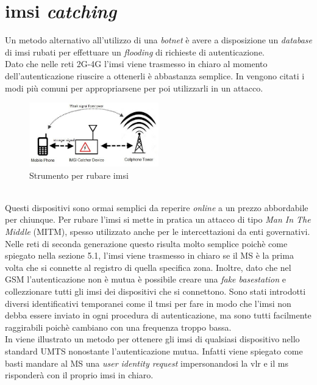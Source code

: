 \section{\gls{imsi} \textit{catching}}
Un metodo alternativo all'utilizzo di una \textit{botnet} è avere a disposizione un \textit{database} di \gls{imsi} rubati per effettuare un \textit{flooding} di richieste di autenticazione.\\
Dato che nelle reti 2G-4G l'\gls{imsi} viene trasmesso in chiaro al momento dell'autenticazione riuscire a ottenerli è abbastanza semplice.
In \cite{imsi-catcher} vengono citati i modi più comuni per appropriarsene per poi utilizzarli in un 
attacco.
\begin{figure}[h]
    \centering
    \includegraphics[width=0.5\textwidth]{images/imsi-catcher.jpg}
    \caption{Strumento per rubare \gls{imsi}}
\end{figure}\\
Questi dispositivi sono ormai semplici da reperire \textit{online} a un prezzo abbordabile per chiunque. Per rubare l'\gls{imsi} si mette in pratica un attacco di tipo \textit{Man In The Middle} (MITM), spesso utilizzato
anche per le intercettazioni da enti governativi.\\
Nelle reti di seconda generazione questo risulta molto semplice poichè come spiegato nella sezione 5.1, l'\gls{imsi} viene trasmesso in chiaro se il MS è la prima volta che si connette al registro di quella specifica
zona. Inoltre, dato che nel GSM l'autenticazione non è mutua è possibile creare una \textit{fake basestation} e collezzionare tutti gli \gls{imsi} dei dispositivi che si connettono.
Sono stati introdotti diversi identificativi temporanei come il \gls{tmsi} per fare in modo che l'\gls{imsi} non debba essere inviato in ogni procedura di autenticazione, ma sono tutti facilmente raggirabili poichè cambiano con una
frequenza troppo bassa.\\
In \cite{dos-imsi} viene illustrato un metodo per ottenere gli \gls{imsi} di qualsiasi dispositivo nello standard UMTS nonostante l'autenticazione mutua. Infatti viene spiegato come basti mandare al MS una \textit{user identity request} impersonandosi 
la \gls{vlr} e il \gls{ms} risponderà con il proprio \gls{imsi} in chiaro.
